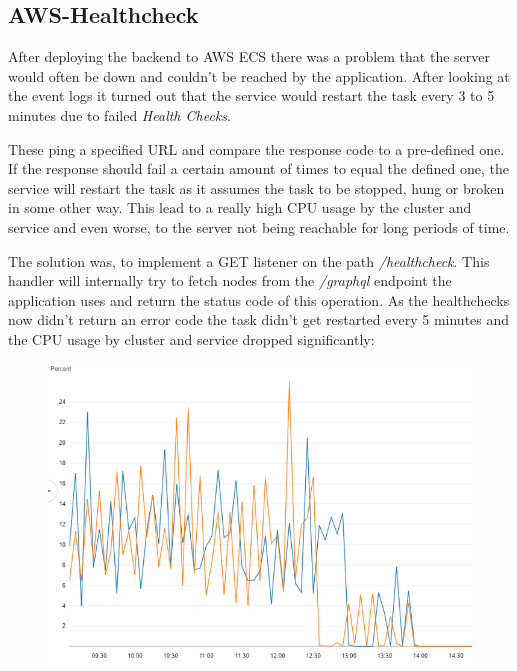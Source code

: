 \subsection{AWS-Healthcheck}
After deploying the backend to AWS ECS there was a problem that the server would often be down and couldn't be reached by the application. After looking at the event logs it turned out that the service would restart the task every 3 to 5 minutes due to failed \emph{Health Checks}. 

These ping a specified URL and compare the response code to a pre-defined one. If the response should fail a certain amount of times to equal the defined one, the service will restart the task as it assumes the task to be stopped, hung or broken in some other way. This lead to a really high CPU usage by the cluster and service and even worse, to the server not being reachable for long periods of time.

The solution was, to implement a GET listener on the path \emph{/healthcheck}. This handler will internally try to fetch nodes from the \emph{/graphql} endpoint the application uses and return the status code of this operation. As the healthchecks now didn't return an error code the task didn't get restarted every 5 minutes and the CPU usage by cluster and service dropped significantly:
\begin{figure}[H]
\centering
\includegraphics[scale=.6]{Bilder/AwsCpuReduction.png}
\end{figure}

